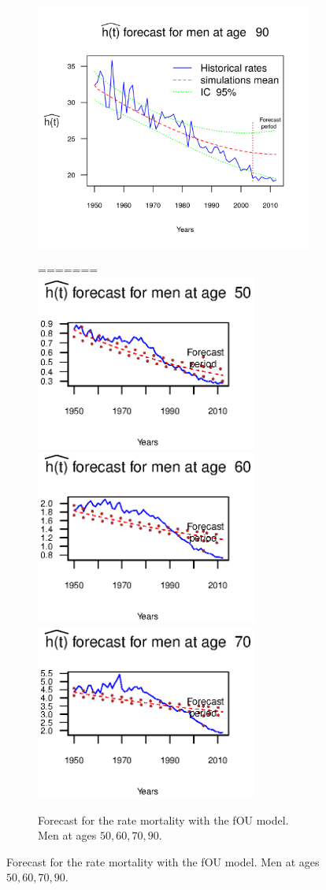 \documentclass[smallextended]{svjour3}
\begin{document}
\begin{figure}[H]
\begin{figure}[H]
    \includegraphics{PlotMenForecast90.png}
    \caption{Forecast for the rate mortality with the fOU model. Men at ages
    $50,60,70,90$.}
=======
    \includegraphics[width = 2.85in]{PlotMenForecast50.eps}
    \includegraphics[width = 2.85in]{PlotMenForecast60.eps}
    \includegraphics[width = 2.85in]{PlotMenForecast70.eps}

\end{figure}
\end{figure}
\end{document}
